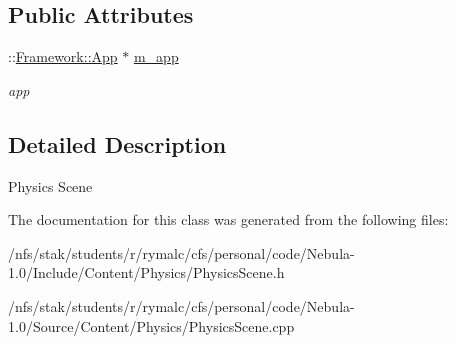 \subsection*{Public Attributes}
\begin{DoxyCompactItemize}
\item 
\hypertarget{classContent_1_1Physics_1_1PhysicsScene_a28ca16f916ff9f4f983f7e1b0a425d7a}{
::\hyperlink{classFramework_1_1App}{Framework::App} $\ast$ \hyperlink{classContent_1_1Physics_1_1PhysicsScene_a28ca16f916ff9f4f983f7e1b0a425d7a}{m\_\-app}}
\label{classContent_1_1Physics_1_1PhysicsScene_a28ca16f916ff9f4f983f7e1b0a425d7a}

\begin{DoxyCompactList}\small\item\em app \item\end{DoxyCompactList}\end{DoxyCompactItemize}


\subsection{Detailed Description}
Physics Scene 

The documentation for this class was generated from the following files:\begin{DoxyCompactItemize}
\item 
/nfs/stak/students/r/rymalc/cfs/personal/code/Nebula-\/1.0/Include/Content/Physics/PhysicsScene.h\item 
/nfs/stak/students/r/rymalc/cfs/personal/code/Nebula-\/1.0/Source/Content/Physics/PhysicsScene.cpp\end{DoxyCompactItemize}
